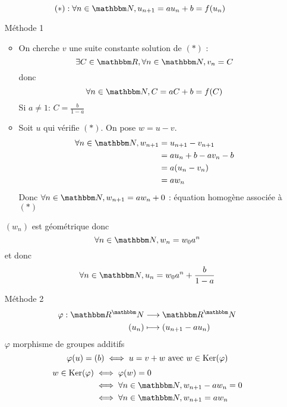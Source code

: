 \begin{rmk}
	\[
		(*): \forall n \in \N, u_{n+1} = au_n + b = f(u_n)
	\]
	\begin{itemize}
		\item[\sc Méthode 1]~\\
			\begin{itemize}
				\item On cherche $v$ une suite constante solution de $(*)$ : \[
					\exists C \in \R, \forall n \in \N, v_n = C
				\] donc \[
					\forall n \in \N, C = aC + b = f(C)
				\] Si $a \neq 1$: $C = \frac{b}{1-a}$ 
			\item Soit $u$ qui vérifie $(*)$. On pose $w = u - v$.
				\begin{align*}
					\forall n \in \N, w_{n+1} &= u_{n+1} - v_{n+1} \\
					&= au_n + b - av_n - b \\
					&= a(u_n - v_n) \\
					&= aw_n\\
				\end{align*}
				Donc $\forall n \in \N, w_{n+1} = aw_n + 0$ : équation homogène associée à $(*)$
			\end{itemize}
			$(w_n)$ est géométrique donc \[
				\forall n \in \N, w_n = w_0 a^n
			\] et donc \[
				\forall n \in \N, u_n = w_0a^n + \frac{b}{1-a}
			\]
		\item[\sc Méthode 2]~\\
			\begin{align*}
				\varphi: \R^\N &\longrightarrow \R^\N \\
				(u_n) &\longmapsto (u_{n+1} - au_n)
			\end{align*}
			$\varphi$ morphisme de groupes additifs \[
				\varphi(u) = (b) \iff u = v + w \text{ avec } w \in \operatorname{Ker}(\varphi)
			\]
			\begin{align*}
				w \in \Ker(\varphi) &\iff \varphi(w) = 0\\
														&\iff \forall n \in \N, w_{n+1} - aw_n = 0\\
														&\iff \forall n \in \N, w_{n+1} = aw_n
			\end{align*}
	\end{itemize}
\end{rmk}
